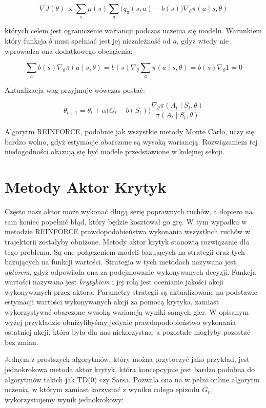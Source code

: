 \documentclass[licencjacka]{pracamgr}
\begin{document}
$$ \nabla J(\theta) \propto \sum_s \mu(s) \sum_a \Big( q_\pi(s, a) - b(s) \Big) \nabla_\theta \pi(a \mid s, \theta) $$

których celem jest ograniczenie wariancji podczas uczenia się modelu. Warunkiem który funkcja $b$ musi spełniać jest jej niezależność od $a$, gdyż wtedy nie wprowadza ona dodatkowego obciążenia:

$$ \sum_a b(s) \nabla_\theta \pi(a \mid s, \theta) = b(s) \nabla_\theta \sum_a \pi(a \mid s, \theta) = b(s) \nabla_\theta 1 = 0 $$

Aktualizacja wag przyjmuje wówczas postać:

$$ \theta_{t+1} = \theta_t + \alpha \Big( G_t - b(S_t) \Big) \frac{\nabla_\theta \pi(A_t \mid S_t, \theta)}{\pi(A_t \mid S_t, \theta)} $$


Algorytm REINFORCE, podobnie jak wszystkie metody Monte Carlo, uczy się bardzo wolno, gdyż estymacje obarczone są wysoką wariancją. Rozwiązaniem tej niedogodności okazują się być modele przedstawione w kolejnej sekcji.

\section{Metody Aktor Krytyk}

Często nasz aktor może wykonać długą serię poprawnych ruchów, a dopiero na sam koniec popełnić błąd, który będzie kosztował go grę. W tym wypadku w metodzie REINFORCE prawdopodobieństwa wykonania wszystkich ruchów w trajektorii zostałyby obniżone. Metody aktor krytyk stanowią rozwiązanie dla tego problemu. Są one połączeniem modeli bazujących na strategii oraz tych bazujących na funkcji wartości. Strategia w tych metodach nazywana jest \emph{aktorem}, gdyż odpowiada ona za podejmowanie wykonywanych decyzji. Funkcja wartości nazywana jest \emph{krytykiem} i jej rolą jest ocenianie jakości akcji wykonywanych przez aktora. Parametry strategii są aktualizowane na podstawie estymacji wartości wykonywanych akcji za pomocą krytyka, zamiast wykorzystywać obarczone wysoką wariancją wyniki samych gier. W opisanym wyżej przykładzie obniżylibyśmy jedynie prawdopodobieństwo wykonania ostatniej akcji, która była dla nas niekorzystna, a pozostałe mogłyby pozostać bez zmian.

Jednym z prostszych algorytmów, który można przytoczyć jako przykład, jest jednokrokowa metoda aktor krytyk, która koncepcyjnie jest bardzo podobna do algorytmów takich jak TD(0) czy Sarsa. Pozwala ona na w pełni online algorytm uczenia, w którym zamiast korzystać z wyniku całego epizodu $G_t$, wykorzystujemy wynik jednokrokowy:
\end{document}
